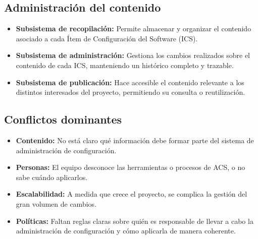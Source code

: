 \subsection{Administración del contenido}\label{subsec:administracion-del-contenido}
\begin{itemize}
    \item \textbf{Subsistema de recopilación:} Permite almacenar y organizar el contenido asociado a cada Ítem de Configuración del Software (ICS).
    \item \textbf{Subsistema de administración:} Gestiona los cambios realizados sobre el contenido de cada ICS, manteniendo un histórico completo y trazable.
    \item \textbf{Subsistema de publicación:} Hace accesible el contenido relevante a los distintos interesados del proyecto, permitiendo su consulta o reutilización.
\end{itemize}

\subsection{Conflictos dominantes}\label{subsec:conflictos-dominantes}
\begin{itemize}
    \item \textbf{Contenido:} No está claro qué información debe formar parte del sistema de administración de configuración.
    \item \textbf{Personas:} El equipo desconoce las herramientas o procesos de ACS, o no sabe cuándo aplicarlos.
    \item \textbf{Escalabilidad:} A medida que crece el proyecto, se complica la gestión del gran volumen de cambios.
    \item \textbf{Políticas:} Faltan reglas claras sobre quién es responsable de llevar a cabo la administración de configuración y cómo aplicarla de manera coherente.
\end{itemize}
